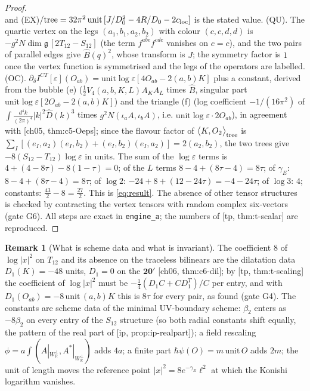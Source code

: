 \documentclass[11pt]{article}
\theoremstyle{plain}
\theoremstyle{definition}
\newtheorem{remark}[theorem]{Remark}
\numberwithin{equation}{section}
\newcommand{\Wp}{W_{\mathbb R}^\perp}
\newcommand{\TPz}[2]{\big\langle #1,#2\big\rangle_{\rm tree}}
\begin{document}
\begin{proof}
\[\]
and (EX)$/\text{tree}=32\pi^2\,\mathrm{unit}\,[J/D_0^2-4R/D_0-2c_{\rm loc}]$ is the stated value. (QU). The quartic vertex on the legs $(a_1,b_1,a_2,b_2)$ with colour $(c,c,d,d)$ is $-g^2N\dim\mathfrak g\,[2T_{12}-S_{12}]$ (the term $f^{abe}f^{cde}$ vanishes on $c=c$), and the two pairs of parallel edges give $\hat B(q)^2$, whose transform is $J$; the symmetry factor is $1$ once the vertex function is symmetrised and the legs of the operators are labelled. (OC). $\partial_\delta I^{CT}[\varepsilon](O_{ab})=\mathrm{unit}\log\varepsilon[4O_{ab}-2(a,b)K]$ plus a constant, derived from the bubble (e) ($\tfrac12V_4(a,b,K,L)A_KA_L$ times $\hat B$, singular part $\mathrm{unit}\log\varepsilon[2O_{ab}-2(a,b)K]$) and the triangle (f) (log coefficient $-1/(16\pi^2)$ of $\int\frac{d^4k}{(2\pi)^4}|k|^2\hat D(k)^3$ times $g^2N(\iota_aA,\iota_bA)$, i.e. $\mathrm{unit}\log\varepsilon\cdot2O_{ab}$), in agreement with [ch05, thm:c5-Oeps]; since the flavour factor of $\TPz{K}{O_2}$ is $\sum_I[(e_I,a_2)(e_I,b_2)+(e_I,b_2)(e_I,a_2)]=2(a_2,b_2)$, the two trees give $-8(S_{12}-T_{12})\log\varepsilon$ in units. The sum of the $\log\varepsilon$ terms is $4+(4-8\tau)-8(1-\tau)=0$; of the $L$ terms $8-4+(8\tau-4)=8\tau$; of $\gamma_E$: $8-4+(8\tau-4)=8\tau$; of $\log2$: $-24+8+(12-24\tau)=-4-24\tau$; of $\log3$: $4$; constants: $\tfrac{43}2-8=\tfrac{27}2$. This is \eqref{eq:result}. The absence of other tensor structures is checked by contracting the vertex tensors with random complex six-vectors (gate G6). All steps are exact in \texttt{engine\_a}; the numbers of [tp, thm:t-scalar] are reproduced.
\end{proof}

\begin{remark}[What is scheme data and what is invariant]
The coefficient $8$ of $\log|x|^2$ on $T_{12}$ and its absence on the traceless bilinears are the dilatation data $D_1(K)=-48$ units, $D_1=0$ on the $\mathbf{20'}$ [ch06, thm:c6-dil]; by [tp, thm:t-scaling] the coefficient of $\log|x|^2$ must be $-\tfrac14(D_1C+CD_1^T)/C$ per entry, and with $D_1(O_{ab})=-8\,\mathrm{unit}\,(a,b)K$ this is $8\tau$ for every pair, as found (gate G4). The constants are scheme data of the minimal UV-boundary scheme: $\beta_2$ enters as $-8\beta_2$ on every entry of the $S_{12}$ structure (so both radial constants shift equally, the pattern of the real part of [ip, prop:ip-realpart]); a field rescaling $\phi=a\int(A|_{\Wp},A^*|_{\Wp})$ adds $4a$; a finite part $\hbar\psi(O)=m\,\mathrm{unit}\,O$ adds $2m$; the unit of length moves the reference point $|x|^2=8e^{-\gamma_E}\ell^2$ at which the Konishi logarithm vanishes.
\end{remark}
\end{document}
